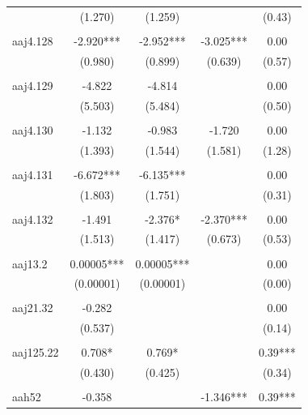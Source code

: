 \documentclass[12pt, a4paper]{article}
\begin{document}
{\begin{longtable}{@{\extracolsep{5pt}}lcccc}
				& (1.270)    & (1.259)    &           & (0.43)  \\
				&            &            &           &         \\
				aaj4.128   & -2.920***  & -2.952***  & -3.025*** & 0.00    \\
				& (0.980)    & (0.899)    & (0.639)   & (0.57)  \\
				&            &            &           &         \\
				aaj4.129   & -4.822     & -4.814     &           & 0.00    \\
				& (5.503)    & (5.484)    &           & (0.50)  \\
				&            &            &           &         \\
				aaj4.130   & -1.132     & -0.983     & -1.720    & 0.00    \\
				& (1.393)    & (1.544)    & (1.581)   & (1.28)  \\
				&            &            &           &         \\
				aaj4.131   & -6.672***  & -6.135***  &           & 0.00    \\
				& (1.803)    & (1.751)    &           & (0.31)  \\
				&            &            &           &         \\
				aaj4.132   & -1.491     & -2.376*    & -2.370*** & 0.00    \\
				& (1.513)    & (1.417)    & (0.673)   & (0.53)  \\
				&            &            &           &         \\
				aaj13.2    & 0.00005*** & 0.00005*** &           & 0.00    \\
				& (0.00001)  & (0.00001)  &           & (0.00)  \\
				&            &            &           &         \\
				aaj21.32   & -0.282     &            &           & 0.00    \\
				& (0.537)    &            &           & (0.14)  \\
				&            &            &           &         \\
				aaj125.22  & 0.708*     & 0.769*     &           & 0.39*** \\
				& (0.430)    & (0.425)    &           & (0.34)  \\
				&            &            &           &         \\
				aah52      & -0.358     &            & -1.346*** & 0.39*** \\

\end{longtable}}
\end{document}
